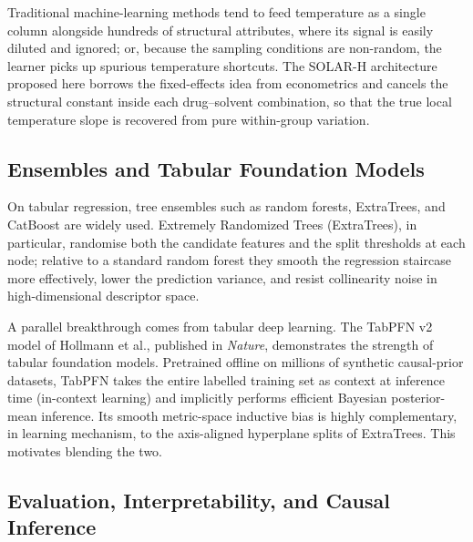 Traditional machine-learning methods tend to feed temperature as a single column alongside hundreds of structural attributes, where its signal is easily diluted and ignored; or, because the sampling conditions are non-random, the learner picks up spurious temperature shortcuts. The SOLAR-H architecture proposed here borrows the fixed-effects idea from econometrics and cancels the structural constant inside each drug--solvent combination, so that the true local temperature slope is recovered from pure within-group variation.

\subsection{Ensembles and Tabular Foundation Models}

On tabular regression, tree ensembles such as random forests, ExtraTrees, and CatBoost\cite{catboost2018} are widely used. Extremely Randomized Trees (ExtraTrees\cite{extratrees2006}), in particular, randomise both the candidate features and the split thresholds at each node; relative to a standard random forest they smooth the regression staircase more effectively, lower the prediction variance, and resist collinearity noise in high-dimensional descriptor space.

A parallel breakthrough comes from tabular deep learning. The TabPFN v2 model of Hollmann et al., published in \textit{Nature}, demonstrates the strength of tabular foundation models\cite{tabpfn2025}. Pretrained offline on millions of synthetic causal-prior datasets, TabPFN takes the entire labelled training set as context at inference time (in-context learning) and implicitly performs efficient Bayesian posterior-mean inference. Its smooth metric-space inductive bias is highly complementary, in learning mechanism, to the axis-aligned hyperplane splits of ExtraTrees. This motivates blending the two.

\subsection{Evaluation, Interpretability, and Causal Inference}

